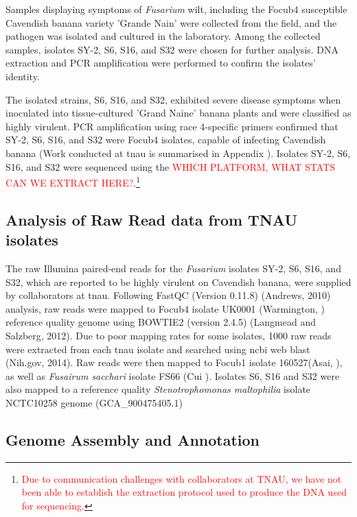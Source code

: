 Samples displaying symptoms of \textit{Fusarium} wilt, including the \ac{Focub4} susceptible Cavendish banana variety 'Grande Nain' were collected from the field, and the pathogen was isolated and cultured in the laboratory. Among the collected samples, isolates SY-2, S6, S16, and S32 were chosen for further analysis. DNA extraction and PCR amplification were performed to confirm the isolates' identity. 

The isolated strains, S6, S16, and S32, exhibited severe disease symptoms when inoculated into tissue-cultured 'Grand Naine' banana plants and were classified as highly virulent. PCR amplification using race 4-specific primers confirmed that SY-2, S6, S16, and S32 were \ac{Focub4} isolates, capable of infecting Cavendish banana (Work conducted at \ac{tnau} is summarised in Appendix ). Isolates SY-2, S6, S16, and S32 were sequenced using the \textcolor{red}{WHICH PLATFORM, WHAT STATS CAN WE EXTRACT HERE?}.\footnote{\textcolor{red}{Due to communication challenges with collaborators at TNAU, we have not been able to establish the extraction protocol used to produce the DNA used for sequencing.}}

\subsection{Analysis of Raw Read data from TNAU isolates}

The raw Illumina paired-end reads for the \textit{Fusarium} isolates SY-2, S6, S16, and S32, which are reported to be highly virulent on Cavendish banana, were supplied by collaborators at \ac{tnau}. Following FastQC (Version 0.11.8) (Andrews, 2010) analysis, raw reads were mapped to \ac{Focub4}  isolate UK0001 (Warmington, ) reference quality genome using BOWTIE2 (version 2.4.5) (Langmead and Salzberg, 2012). Due to poor mapping rates for some isolates, 1000 raw reads were extracted from each \ac{tnau} isolate and searched using \ac{ncbi} web \ac{blast} (Nih.gov, 2014). 
Raw reads were then mapped to \ac{Focub1} isolate 160527(Asai, ), as well as \textit{Fusairum sacchari} isolate FS66 (Cui ). Isolates S6, S16 and S32 were also mapped to a reference quality \textit{Stenotrophomonas maltophilia} isolate NCTC10258 genome (GCA\_900475405.1) 

\subsection{Genome Assembly and Annotation}

